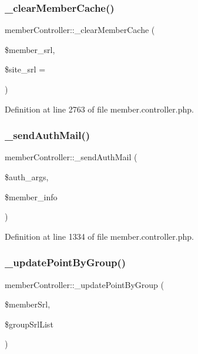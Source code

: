 \subsubsection{\texorpdfstring{\+\_\+clear\+Member\+Cache()}{\_clearMemberCache()}}
{\footnotesize\ttfamily member\+Controller\+::\+\_\+clear\+Member\+Cache (\begin{DoxyParamCaption}\item[{}]{\$member\+\_\+srl,  }\item[{}]{\$site\+\_\+srl = {} }\end{DoxyParamCaption})}



Definition at line 2763 of file member.\+controller.\+php.

\hypertarget{classmemberController_a8768cc1066bf70222fdd0f0fa2d55d31}{}\label{classmemberController_a8768cc1066bf70222fdd0f0fa2d55d31} 
\subsubsection{\texorpdfstring{\+\_\+send\+Auth\+Mail()}{\_sendAuthMail()}}
{\footnotesize\ttfamily member\+Controller\+::\+\_\+send\+Auth\+Mail (\begin{DoxyParamCaption}\item[{}]{\$auth\+\_\+args,  }\item[{}]{\$member\+\_\+info }\end{DoxyParamCaption})}



Definition at line 1334 of file member.\+controller.\+php.

\hypertarget{classmemberController_abe9b21621506198b75656781e6919dba}{}\label{classmemberController_abe9b21621506198b75656781e6919dba} 
\subsubsection{\texorpdfstring{\+\_\+update\+Point\+By\+Group()}{\_updatePointByGroup()}}
{\footnotesize\ttfamily member\+Controller\+::\+\_\+update\+Point\+By\+Group (\begin{DoxyParamCaption}\item[{}]{\$member\+Srl,  }\item[{}]{\$group\+Srl\+List }\end{DoxyParamCaption})}



